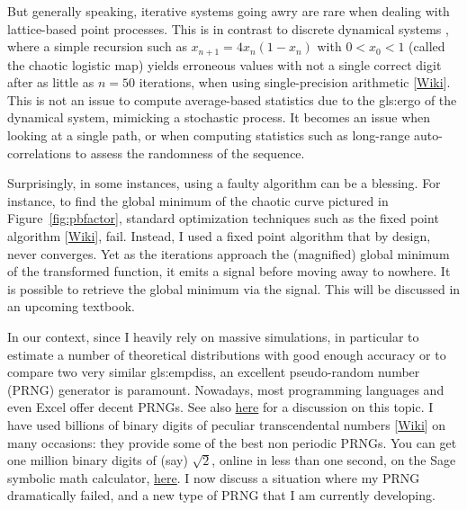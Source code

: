 \documentclass[10pt]{article}
\begin{document}
But generally speaking, iterative systems going awry are rare when dealing with lattice-based point processes. This is in contrast to discrete \textcolor{index}{dynamical systems}
, where a
simple recursion such as $x_{n+1}=4x_n(1-x_n)$ with $0<x_0<1$ (called the chaotic \textcolor{index}{logistic map}) yields erroneous values with not a single correct digit after as little as $n=50$ iterations, when using single-precision arithmetic [\href{https://en.wikipedia.org/wiki/Single-precision_floating-point_format}{Wiki}]. This is not an issue to compute average-based statistics due to the \gls{gls:ergo} of the dynamical system, mimicking a stochastic process. It becomes an issue when looking at a single path, or when computing statistics such as long-range auto-correlations to assess the randomness of the sequence. 

Surprisingly, in some instances, using a faulty algorithm can be a blessing. For instance, to find the global minimum of the chaotic curve pictured in Figure~\ref{fig:pbfactor}, standard optimization 
techniques such as the \textcolor{index}{fixed point algorithm} [\href{https://en.wikipedia.org/wiki/Fixed-point_iteration}{Wiki}], fail. Instead, I used a fixed point algorithm that by design, never converges. Yet as the iterations approach the (magnified) global minimum of the transformed function, it emits a signal before moving away to nowhere. 
It is possible to retrieve the global minimum via the signal. This will be discussed in an upcoming textbook. 

In our context, since I heavily rely on massive \textcolor{index}{simulations}, in particular to estimate a number of theoretical distributions with good enough accuracy or to compare two very similar 
 \glspl{gls:empdis}, an excellent \textcolor{index}{pseudo-random number} (PRNG) generator is paramount. Nowadays, most programming languages and even Excel offer decent PRNGs. See also \href{https://stackoverflow.com/questions/4720822/what-is-the-best-pseudo-random-number-generator-as-of-today}{here} 
for a discussion on this topic. I have used billions of binary digits of peculiar \textcolor{index}{transcendental numbers} [\href{https://en.wikipedia.org/wiki/Transcendental_number}{Wiki}] on many occasions: they provide some of the best non periodic PRNGs. 
You can get one million binary digits of (say) $\sqrt{2}$, online in less than one second, on the Sage 
\textcolor{index}{symbolic math} calculator, \href{https://sagecell.sagemath.org/?z=eJzz0yguLCrRMNLUKShKTbY1NAACTb3ikiKNpMTiVFsjTQCp3gnT&lang=sage}{here}. 
 I now discuss a situation where my PRNG dramatically failed, and a new type of PRNG that I am currently developing. 
\end{document}
